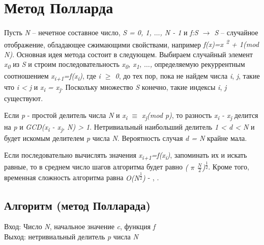 \section{Метод Полларда}

\paragraph{} Пусть \textit{N} – нечетное составное число, \textit{S = {0, 1, {$\dots$}, N - 1}} и \textit{f:S {$\rightarrow$} S} – случайное отображение, 
обладающее сжимающими свойствами, например \textit{f(x)=x\textsuperscript{ 2} + 1(mod N)}. Основная идея метода состоит в следующем. Выбираем случайный 
элемент \textit{x\textsubscript{0}} из \textit{S} и строим последовательность \textit{x\textsubscript{0}, x\textsubscript{1}, {$\dots$}, } 
определяемую рекуррентным соотношением \textit{x\textsubscript{i+1}=f(x\textsubscript{i})}, где \textit{i {$\ge$} 0}, до тех пор, пока не 
найдем числа \textit{i}, \textit{j}, такие что \textit{i < j} и \textit{x\textsubscript{i} = x\textsubscript{j}}. Поскольку множество \textit{S} 
конечно, такие индексы \textit{i}, \textit{j} существуют.

  Если \textit{p} - простой делитель числа \textit{N} и \textit{x\textsubscript{i} {$\equiv$} x\textsubscript{j}(mod p)}, то разность
\textit{x\textsubscript{i} - x\textsubscript{j}} делится на \textit{p} и \textit{GCD(x\textsubscript{i} - x\textsubscript{j}, N) > 1}. Нетривиальный 
наибольший делитель \textit{1 < d < N} и будет искомым делителем \textit{p} числа \textit{N}. Вероятность случая \textit{d = N} крайне мала.

  Если последовательно вычислять значения \textit{x\textsubscript{i+1}=f(x\textsubscript{i})}, запоминать их и искать равные, то в среднем число шагов 
алгоритма будет равно \textit{( {$\pi$} {$\frac{N}{2}$})\textsuperscript{ {$\frac{1}{2}$}}}. Кроме того, временная сложность алгоритма равна
\textit{O(N\textsuperscript{ {$\frac{1}{2}$}})} - \cite[Глава 2.2, страницы 54-60]{ish11}, \cite[Глава 2.4, страницы 61-65]{ish11}.

  \subsection{Алгоритм (метод Полларада)}
  
  Вход: Число \textit{N}, начальное значение \textit{c}, функция \textit{f}  \\
  Выход: нетривиальный делитель \textit{p} числа \textit{N}
  

